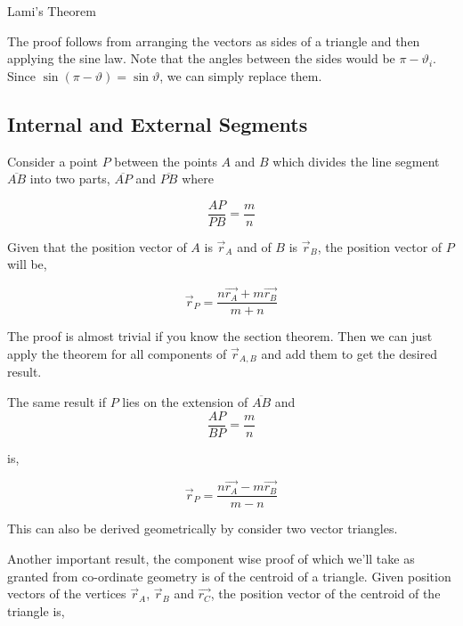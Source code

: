 \begin{marginfigure}
    \centering
    \caption{Lami's Theorem}
    \label{fig: lami}
\end{marginfigure}

The proof follows from arranging the vectors as sides of a triangle and then applying the 
sine law. Note that the angles between the sides would be \(\pi - \vartheta_i\). Since 
\(\sin(\pi-\vartheta) = \sin\vartheta\), we can simply replace them. 

\subsection{Internal and External Segments}

Consider a point \(P\) between the points \(A\) and \(B\) which divides the line segment \(\overline{AB}\) into 
two parts, \(\overline{AP}\) and \(\overline{PB}\) where

\begin{equation*}
    \frac{AP}{PB} = \frac{m}{n}
\end{equation*}

\begin{theorem}
    Given that the position vector of \(A\) is \(\vec{r}_A\) and of \(B\) is 
    \(\vec{r}_B\), the position vector of \(P\) will be,

    \begin{equation}
        \vec{r}_P = \frac{n\vec{r_A} + m\vec{r_B}}{m+n}
    \end{equation}
\end{theorem}

The proof is almost trivial if you know the section theorem. Then we can 
just apply the theorem for all components of \(\vec{r}_{A,B}\) and add them to 
get the desired result. 

The same result if \(P\) lies on the extension of \(\overline{AB}\) and 
\begin{equation*}
    \frac{AP}{BP} = \frac{m}{n}
\end{equation*}

is,

\begin{equation}
    \boxed{\vec{r}_P = \frac{n\vec{r_A} - m\vec{r_B}}{m-n}}
\end{equation}

This can also be derived geometrically by consider two vector triangles. 

Another important result, the component wise proof of which we'll take as granted from 
co-ordinate geometry is of the centroid of a triangle. Given position vectors 
of the vertices \(\vec{r}_A\), \(\vec{r}_B\) and \(\vec{r_C}\), the position 
vector of the centroid of the triangle is,

